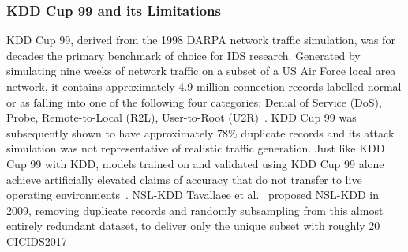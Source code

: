 \subsubsection{KDD Cup 99 and its Limitations}
KDD Cup 99, derived from the 1998 DARPA network traffic simulation, was for decades the primary benchmark of choice for IDS research. Generated by simulating nine weeks of network traffic on a subset of a US Air Force local area network, it contains approximately 4.9 million connection records labelled normal or as falling into one of the following four categories: Denial of Service (DoS), Probe, Remote-to-Local (R2L), User-to-Root (U2R)~\cite{tavallaee2009nslkdd}. KDD Cup 99 was subsequently shown to have approximately 78\% duplicate records and its attack simulation was not representative of realistic traffic generation. Just like KDD Cup 99 with KDD, models trained on and validated using KDD Cup 99 alone achieve artificially elevated claims of accuracy that do not transfer to live operating environments~\cite{tavallaee2009nslkdd}.
NSL-KDD
Tavallaee et al.~\cite{tavallaee2009nslkdd} proposed NSL-KDD in 2009, removing duplicate records and randomly subsampling from this almost entirely redundant dataset, to deliver only the unique subset with roughly 20%
CICIDS2017
